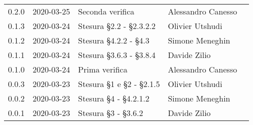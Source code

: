{\begin{longtable}{ c c  C{4cm}  C{3cm}  C{3.5cm} }
   		0.2.0 & 2020-03-25 & Seconda verifica & Alessandro Canesso &\ver{}\\
		0.1.3 & 2020-03-24 & Stesura \S 2.2 - \S 2.3.2.2 & Olivier Utshudi &\adm{}\\
		0.1.2 & 2020-03-24 & Stesura \S 4.2.2 - \S 4.3 & Simone Meneghin &\adm{}\\		
		0.1.1 & 2020-03-24 & Stesura \S 3.6.3 - \S 3.8.4 & Davide Zilio &\adm{}\\
		0.1.0 & 2020-03-24 & Prima verifica & Alessandro Canesso &\ver{}\\
		0.0.3 & 2020-03-23 & Stesura \S 1 e \S 2 - \S 2.1.5 & Olivier Utshudi &\adm{}\\
		0.0.2 & 2020-03-23 & Stesura \S 4 - \S 4.2.1.2 & Simone Meneghin &\adm{}\\
		0.0.1 & 2020-03-23 & Stesura \S 3 - \S 3.6.2 & Davide Zilio &\adm{}\\		
	\end{longtable}
}